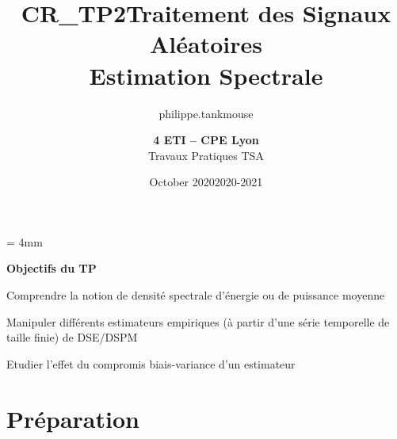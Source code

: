\documentclass{article}
\title{CR_TP2}
\author{philippe.tankmouse }
\date{October 2020}
\begin{document}
\baselineskip = 4mm
\title{Traitement des Signaux Aléatoires \\
Estimation Spectrale}
\author{\textbf{4 ETI -- CPE Lyon }\\[3mm]
{Travaux Pratiques TSA}}
\date{2020-2021}

\maketitle

\noindent{}
\vspace*{5mm}


\textbf{\Large Objectifs du TP}\\[4mm]

\begin{list}{-}{\setlength{\leftmargin}{3mm} \setlength{\labelwidth}{20mm} \setlength{\labelsep}{2mm} \setlength{\itemsep}{1mm} }
\item Comprendre la notion de densité spectrale d'énergie ou de puissance moyenne
\item Manipuler différents estimateurs empiriques (à partir d'une série temporelle de taille finie) de DSE/DSPM
\item Etudier l'effet du compromis biais-variance d'un estimateur
\end{list}


\vspace*{5mm}

\section{Préparation}
\end{document}
